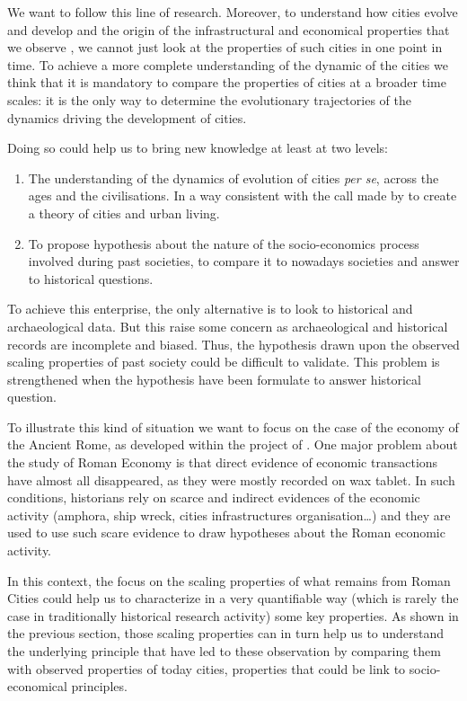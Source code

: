 \documentclass[a4paper,11pt]{article}
\begin{document}
We want to follow this line of research. Moreover, to understand how cities evolve and develop and the origin of the infrastructural and economical properties that we observe \citep{bettencourt2013theoriginsofscalingincities}, we cannot just look at the properties of such cities in one point in time.   
To achieve a more complete understanding of the dynamic of the cities we think that it is mandatory to compare the properties of cities at a broader time scales: it is the only way to determine the evolutionary trajectories of the dynamics driving the development of cities.

Doing so could help us to bring new knowledge at least at two levels:
\begin{enumerate}
\item The understanding of the dynamics of evolution of cities \emph{per se}, across the ages and the civilisations. In a way consistent with the call made by \cite{bettencourt2007growthinnovationscalingandthepaceoflifeincities,batty2013theory} to create a theory of cities and urban living.
    \item To propose hypothesis about the nature of the socio-economics process involved during past societies, to compare it to nowadays societies and answer to historical questions.
\end{enumerate}

To achieve this enterprise, the only alternative is to look to historical and archaeological data. But this raise some concern as archaeological and historical records are incomplete and biased. Thus, the hypothesis drawn upon the observed scaling properties of past society could be difficult to validate. This problem is strengthened when the hypothesis have been formulate to answer historical question.

To illustrate this kind of situation we want to focus on the case of the economy of the Ancient Rome, as developed within the project of \cite{remesal2014epnet}. One major problem about the study of Roman Economy is that direct evidence of economic transactions have almost all disappeared, as they were mostly recorded on wax tablet. In such conditions, historians rely on scarce and indirect evidences of the economic activity (amphora, ship wreck, cities infrastructures organisation\ldots) and they are used to use such scare evidence to draw hypotheses about the Roman economic activity. 

In this context, the focus on the scaling properties of what remains from Roman Cities could help us to characterize in a very quantifiable way (which is rarely the case in traditionally historical research activity) some key properties.
As shown in the previous section, those scaling properties can in turn help us to understand the underlying principle that have led to these observation by comparing them with observed properties of today cities, properties that could be link to socio-economical principles.
\end{document}
